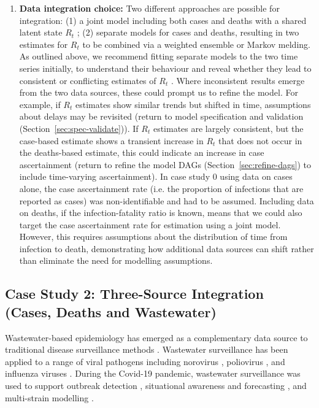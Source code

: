 \documentclass{article}
\begin{document}
\begin{enumerate}
    \item \textbf{Data integration choice:} 
       Two different approaches are possible for integration: (1) a joint model including both cases and deaths with a shared latent state $R_t$ \citep{scott2020epidemia}; (2) separate models for cases and deaths, resulting in two estimates for $R_t$ to be combined via a weighted ensemble or Markov melding.
        As outlined above, we recommend fitting separate models to the two time series initially, to understand their behaviour and reveal whether they lead to consistent or conflicting estimates of $R_t$ \citep{sherratt2021exploring}. Where inconsistent results emerge from the two data sources, these could prompt us to refine the model. For example, if $R_t$ estimates show similar trends but shifted in time, assumptions about delays may be revisited (return to model specification and validation (Section~\ref{sec:spec-validate})). If $R_t$ estimates are largely consistent, but the case-based estimate shows a transient increase in $R_t$ that does not occur in the deaths-based estimate, this could indicate an increase in case ascertainment (return to refine the model DAGs (Section~\ref{sec:refine-dags}) to include time-varying ascertainment). In case study 0 using data on cases alone, the case ascertainment rate (i.e. the proportion of infections that are reported as cases) was non-identifiable and had to be assumed. Including data on deaths, if the infection-fatality ratio is known, means that we could also target the case ascertainment rate for estimation using a joint model. However, this requires assumptions about the distribution of time from infection to death, demonstrating how additional data sources can shift rather than eliminate the need for modelling assumptions. 
\end{enumerate}

\subsection{Case Study 2: Three-Source Integration (Cases, Deaths and Wastewater)}

Wastewater-based epidemiology has emerged as a complementary data source to traditional disease surveillance methods \citep{keshaviah2023wastewater}. Wastewater surveillance has been applied to a range of viral pathogens including norovirus \citep{zheng2024tracking}, poliovirus \citep{whitehouse2024wastewater}, and influenza viruses \citep{zheng2023development}. During the Covid-19 pandemic, wastewater surveillance was used to support outbreak detection \citep{hewitt2022sensitivity}, situational awareness and forecasting \citep{varkila2023use,jin2024combining}, and multi-strain modelling \citep{dreifuss2025estimated}. 
\end{document}
